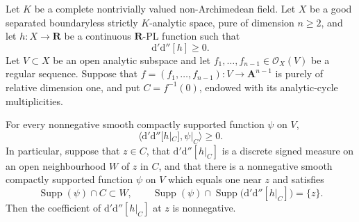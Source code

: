 \begin{proposition}
Let $K$ be a complete nontrivially valued non-Archimedean field.  Let $X$ be
a good separated boundaryless strictly $K$-analytic space, pure of dimension
$n\geq2$, and let $h:X\to\mathbf R$ be a continuous $\mathbf R$-PL
function such that
\[
                         \mathrm d'\mathrm d''[h]\geq0.
\]
Let $V\subset X$ be an open analytic subspace and let
$f_1,\ldots,f_{n-1}\in\mathcal O_X(V)$ be a regular sequence.  Suppose that
$f=(f_1,\ldots,f_{n-1}):V\to\mathbf A^{n-1}$ is purely of relative
dimension one, and put $C=f^{-1}(0)$, endowed with its analytic-cycle
multiplicities.

For every nonnegative smooth compactly supported function $\psi$ on $V$,
\[
 \bigl\langle\mathrm d'\mathrm d''[h|_C],\psi|_C\bigr\rangle\geq0.
\]
In particular, suppose that $z\in C$, that
$\mathrm d'\mathrm d''[h|_C]$ is a discrete signed measure on an open
neighbourhood $W$ of $z$ in $C$, and that there is a nonnegative smooth
compactly supported function $\psi$ on $V$ which equals one near $z$ and
satisfies
\[
 \operatorname{Supp}(\psi)\cap C\subset W,
 \qquad
 \operatorname{Supp}(\psi)\cap
 \operatorname{Supp}\bigl(\mathrm d'\mathrm d''[h|_C]\bigr)=\{z\}.
\]
Then the coefficient of $\mathrm d'\mathrm d''[h|_C]$ at $z$ is
nonnegative.
\end{proposition}

